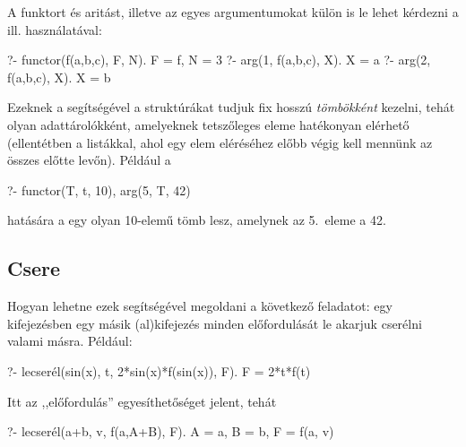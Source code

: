 A funktort és aritást, illetve az egyes
argumentumokat külön is le lehet kérdezni a
 ill.  használatával:
\begin{query}
?- functor(f(a,b,c), F, N).
F = f,
N = 3
?- arg(1, f(a,b,c), X).
X = a
?- arg(2, f(a,b,c), X).
X = b
\end{query}
Ezeknek a segítségével a struktúrákat tudjuk fix
hosszú \emph{tömbökként} kezelni, tehát olyan
adattárolókként, amelyeknek tetszőleges eleme
hatékonyan elérhető (ellentétben a listákkal, ahol
egy elem eléréséhez előbb végig kell mennünk
az összes előtte levőn).
Például a
\begin{query}
?- functor(T, t, 10), arg(5, T, 42)
\end{query}
hatására a  egy olyan 10-elemű tömb lesz,
amelynek az 5.~eleme a 42.

\subsection*{Csere}
Hogyan lehetne ezek segítségével megoldani a
következő feladatot: egy kifejezésben egy másik
(al)kifejezés minden előfordulását le akarjuk
cserélni valami másra. Például:
\begin{query}
?- lecserél(sin(x), t, 2*sin(x)*f(sin(x)), F).
F = 2*t*f(t)
\end{query}
Itt az ,,előfordulás'' egyesíthetőséget jelent,
tehát
\begin{query}
?- lecserél(a+b, v, f(a,A+B), F).
A = a,
B = b,
F = f(a, v)
\end{query}

